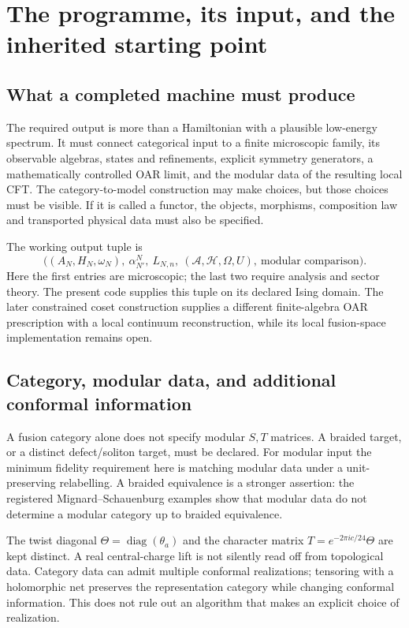 \section{The programme, its input, and the inherited starting point}

\subsection{What a completed machine must produce}

The required output is more than a Hamiltonian with a plausible low-energy
spectrum. It must connect categorical input to a finite microscopic family,
its observable algebras, states and refinements, explicit symmetry generators,
a mathematically controlled OAR limit, and the modular data of the resulting
local CFT. The category-to-model construction may make choices, but those
choices must be visible. If it is called a functor, the objects, morphisms,
composition law and transported physical data must also be specified.

The working output tuple is
\[
 \bigl((A_N,H_N,\omega_N),\ \alpha_{N'}^N,\ L_{N,n},\
       (\mathcal A,\mathcal H,\Omega,U),\ \text{modular comparison}\bigr).
\]
Here the first entries are microscopic; the last two require analysis and
sector theory. The present code supplies this tuple on its declared Ising
domain. The later constrained coset construction supplies a different
finite-algebra OAR prescription with a local continuum reconstruction, while
its local fusion-space implementation remains open.

\subsection{Category, modular data, and additional conformal information}

A fusion category alone does not specify modular $S,T$ matrices. A braided
target, or a distinct defect/soliton target, must be declared. For modular
input the minimum fidelity requirement here is matching modular data under
a unit-preserving relabelling. A braided equivalence is a stronger assertion:
the registered Mignard--Schauenburg examples show that modular data do not
determine a modular category up to braided equivalence.

The twist diagonal $\Theta=\operatorname{diag}(\theta_a)$ and the character
matrix $T=e^{-2\pi i c/24}\Theta$ are kept distinct. A real central-charge
lift is not silently read off from topological data. Category data can admit
multiple conformal realizations; tensoring with a holomorphic net preserves
the representation category while changing conformal information. This does
not rule out an algorithm that makes an explicit choice of realization.

